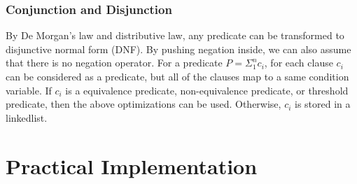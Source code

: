 \documentclass[preprint]{sigplanconf}
\newtheorem{definition}{Definition}
\newtheorem{proposition}{Proposition}
\begin{document}
%
\subsubsection{Conjunction and Disjunction}
By De Morgan's law and distributive law, any predicate can be transformed to
disjunctive normal form (DNF). By pushing negation inside, we can also assume 
that there is no negation operator. For a predicate $P = \Sigma_{1}^{n}c_i$, 
for each clause $c_i$ can be considered as a predicate, but all of the clauses 
map to a same condition variable. If $c_i$ is a equivalence predicate, 
non-equivalence predicate, or threshold predicate, then the above optimizations
can be used. Otherwise, $c_i$ is stored in a linkedlist. 
\section{Practical Implementation} \label{sec:imp}
\end{document}
